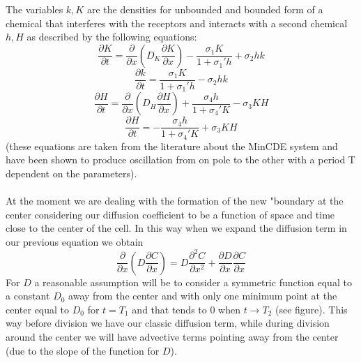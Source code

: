 \documentclass[12pt]{article}
\begin{document}
The variables $k, K$ are the densities for unbounded and bounded form of a chemical that interferes with the receptors and interacts with a second chemical $h,H$ as described by the following equations:
\begin{equation}
\frac{\partial K}{\partial t}=\frac{\partial}{\partial x}(D_K\frac{\partial K}{\partial x})-\frac{\sigma_1K}{1+\sigma_1'h}+\sigma_2hk
\end{equation}
\begin{equation}
\frac{\partial k}{\partial t}=\frac{\sigma_1K}{1+\sigma_1'h}-\sigma_2hk
\end{equation}
\begin{equation}
\frac{\partial H}{\partial t}=\frac{\partial}{\partial x}(D_H\frac{\partial H}{\partial x})+\frac{\sigma_4h}{1+\sigma_4'K}-\sigma_3KH
\end{equation}
\begin{equation}
\frac{\partial H}{\partial t}=-\frac{\sigma_4h}{1+\sigma_4'K}+\sigma_3KH
\end{equation}
(these equations are taken from the literature about the MinCDE system and have been shown to produce oscillation from on pole to the other with a period T dependent on the parameters).\\\\

At the moment we are dealing with the formation of the new "boundary at the center considering our diffusion coefficient to be a function of space and time close to the center of the cell.
In this way when we expand the diffusion term in our previous equation we obtain
\begin{equation}
\frac{\partial}{\partial x}\left(D\frac{\partial C}{\partial x}\right)=D\frac{\partial^2 C}{\partial x^2}+\frac{\partial D}{\partial x}\frac{\partial C}{\partial x}
\end{equation}
For $D$ a reasonable assumption will be to consider a symmetric function equal to a constant $D_0$ away from the center and with only one minimum point at the center equal to $D_0$ for $t=T_1$ and that tends to 0 when $t\rightarrow T_2$ (see figure). This way before division we have our classic diffusion term, while during division around the center we will have advective terms pointing away from the center (due to the slope of the function for $D$).
\end{document}

